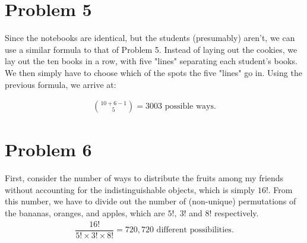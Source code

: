 \documentclass[11pt]{article}
\begin{document}
\section*{Problem 5}
	Since the notebooks are identical, but the students (presumably) aren't, we can use a similar formula to that of Problem 5. Instead of laying 
	out the cookies, we lay out the ten books in a row, with five "lines" separating each student's books. We then simply have to choose which of the 
	spots the five "lines" go in. Using the previous formula, we arrive at:

	\begin{align*}
	\binom{10+6-1}{5} = 3003 \text{ possible ways.}
	\end{align*}


\section*{Problem 6}
	First, consider the number of ways to distribute the fruits among my friends without accounting for the indistinguishable objects, which is 
	simply $16!$. From this number, we have to divide out the number of (non-unique) permutations of the bananas, oranges, and apples, which are 
	$5!, \ 3!$ and $8!$ respectively. 
	\begin{align*}	
	\dfrac{16!}{5! \times 3! \times 8!} = 720,720 \text{ different possibilities.}
	\end{align*}
	
	
\end{document}
